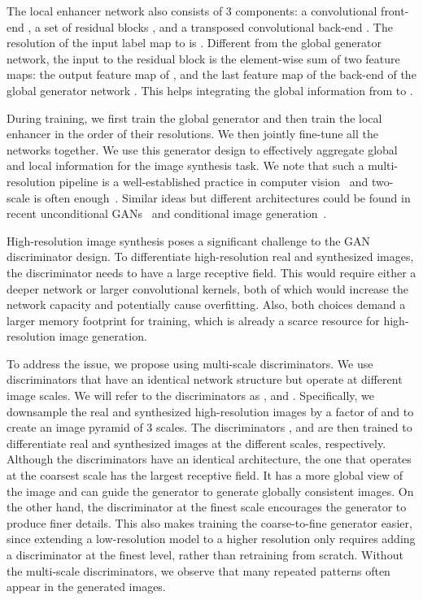 \documentclass[10pt,twocolumn,letterpaper]{article}
\begin{document}
The local enhancer network also consists of 3 components: a convolutional front-end , a set of residual blocks , and a transposed convolutional back-end . The resolution of the input label map to  is . Different from the global generator network, the input to the residual block  is the element-wise sum of two feature maps: the output feature map of , and the last feature map of the back-end of the global generator network . This helps integrating the global information from  to . 

During training, we first train the global generator and then train the local enhancer in the order of their resolutions. We then jointly fine-tune all the networks together. We use this generator design to effectively aggregate global and local information for the image synthesis task. We note that such a multi-resolution pipeline is a well-established practice in computer vision~\cite{burt1983laplacian} and two-scale is often enough~\cite{brown2003recognising}. Similar ideas but different architectures could be found in recent unconditional GANs~\cite{denton2015deep,huang2017sgan} and conditional image generation~\cite{chen2017photographic,zhang2016stackgan}.

 High-resolution image synthesis poses a significant challenge to the GAN discriminator design. To differentiate high-resolution real and synthesized images, the discriminator needs to have a large receptive field. This would require either a deeper network or larger convolutional kernels, both of which would increase the network capacity and potentially cause overfitting. Also, both choices demand a larger memory footprint for training, which is already a scarce resource for high-resolution image generation.

To address the issue, we propose using multi-scale discriminators. We use  discriminators that have an identical network structure but operate at different image scales. We will refer to the discriminators as ,  and . Specifically, we downsample the real and synthesized high-resolution images by a factor of  and  to create an image pyramid of 3 scales. The discriminators ,  and  are then trained to differentiate real and synthesized images at the  different scales, respectively. Although the discriminators have an identical architecture, the one that operates at the coarsest scale has the largest receptive field. It has a more global view of the image and can guide the generator to generate globally consistent images. On the other hand, the discriminator at the finest scale encourages the generator to produce finer details. This also makes training the coarse-to-fine generator easier, since extending a low-resolution model to a higher resolution only requires adding a discriminator at the finest level, rather than retraining from scratch.
Without the multi-scale discriminators, we observe that many repeated patterns often appear in the generated images.
\end{document}
